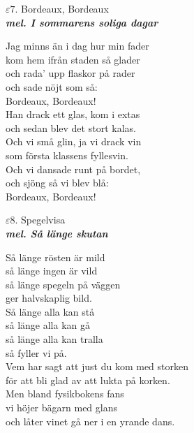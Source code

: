 \documentclass[a6paper,10pt]{article}
\newcommand{\mel}[1]{\small\textbf{\textit{mel. #1 \\}}}
\begin{document}
\setlength{\oddsidemargin}{-0.47in}
\noindent
\begin{center}
\Large $\varepsilon7$. Bordeaux, Bordeaux\\ 
\mel{I sommarens soliga dagar}
\end{center}
Jag minns än i dag hur min fader\\
kom hem ifrån staden så glader\\
och rada' upp flaskor på rader\\
och sade nöjt som så:\\
Bordeaux, Bordeaux!
\vspace{5pt}\\
Han drack ett glas, kom i extas\\
och sedan blev det stort kalas.\\
Och vi små glin, ja vi drack vin\\
som första klassens fyllesvin.\\
Och vi dansade runt på bordet,\\
och sjöng så vi blev blå:\\
Bordeaux, Bordeaux!
\vspace{20pt}
\begin{center}
\Large $\varepsilon8$. Spegelvisa \\ 
\mel{Så länge skutan}
\end{center}
Så länge rösten är mild\\
så länge ingen är vild\\
så länge spegeln på väggen\\
ger halvskaplig bild.\\
Så länge alla kan stå\\
så länge alla kan gå\\
så länge alla kan tralla\\
så fyller vi på.
\vspace{5pt}\\
Vem har sagt att just du kom med storken\\
för att bli glad av att lukta på korken.\\
Men bland fysikbokens fans\\
vi höjer bägarn med glans\\
och låter vinet gå ner i en yrande dans.
\end{document}
